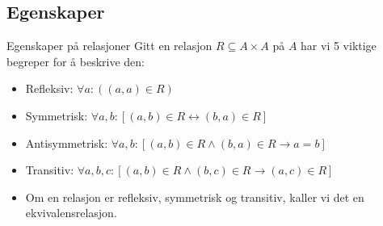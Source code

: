 \subsection{Egenskaper}
\begin{frame}[fragile]{Egenskaper på relasjoner}
Gitt en relasjon $R \subseteq A \times A$ på $A$ har vi 5 viktige begreper for å beskrive den:
    \begin{itemize}
        \item Refleksiv: $\forall a : ((a, a) \in R)$
        \pause
        \item Symmetrisk: $\forall a, b : [(a, b) \in R \leftrightarrow (b, a) \in R]$
        \pause
        \item Antisymmetrisk: $\forall a, b : [(a, b) \in R \land (b, a) \in R \rightarrow a = b]$
        \pause
        \item Transitiv: $\forall a, b, c : [(a, b) \in R \land (b, c) \in R \rightarrow (a, c) \in R]$\\
        \pause
        \item Om en relasjon er refleksiv, symmetrisk og transitiv, kaller vi det en ekvivalensrelasjon.
    \end{itemize}   
\end{frame}

